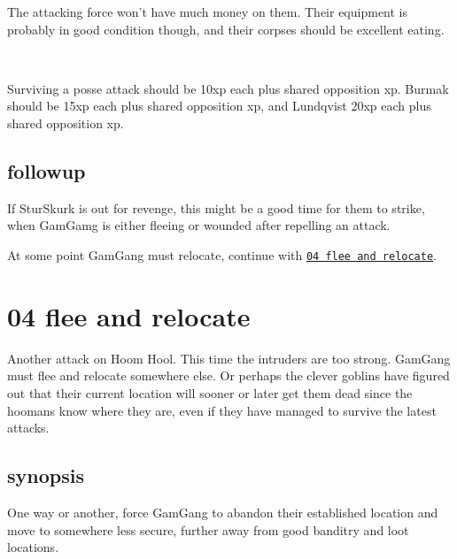 The attacking force won't have much money on them. Their equipment is probably in good condition though, and their corpses should be excellent eating.

\

Surviving a posse attack should be 10xp each plus shared opposition xp. Burmak should be 15xp each plus shared opposition xp, and Lundqvist 20xp each plus shared opposition xp.


\subsection*{followup}

If SturSkurk is out for revenge, this might be a good time for them to strike, when GamGamg is either fleeing or wounded after repelling an attack.

At some point GamGang must relocate, continue with 
\hyperref[04fleeandrelocate]{\texttt{04 flee and relocate}}.












\clearpage
\section*{04 flee and relocate}
\label{04fleeandrelocate}

Another attack on Hoom Hool. This time the intruders are too strong. GamGang must flee and relocate somewhere else. Or perhaps the clever goblins have figured out that their current location will sooner or later get them dead since the hoomans know where they are, even if they have managed to survive the latest attacks.


\subsection*{synopsis}

One way or another, force GamGang to abandon their established location and move to somewhere less secure, further away from good banditry and loot locations.


